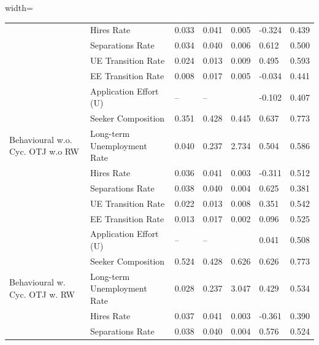 \begin{adjustbox}{width=\textwidth}
\begin{tabular}{lllllll}
\cellcolor{modelBehaviouralwCycOTJwoRW!25} & Hires Rate & 0.033 & 0.041 & 0.005 & \cellcolor{green!70!yellow!25}-0.324 & 0.439 \\
\cellcolor{modelBehaviouralwCycOTJwoRW!25} & Separations Rate & 0.034 & 0.040 & 0.006 & \cellcolor{green!70!yellow!25}0.612 & 0.500 \\
\cellcolor{modelBehaviouralwCycOTJwoRW!25} & UE Transition Rate & 0.024 & 0.013 & 0.009 & \cellcolor{green!25}0.495 & 0.593 \\
\cellcolor{modelBehaviouralwCycOTJwoRW!25} & EE Transition Rate & 0.008 & 0.017 & 0.005 & \cellcolor{orange!25}-0.034 & 0.441 \\
\cellcolor{modelBehaviouralwCycOTJwoRW!25} & Application Effort (U) & -- & -- &  & \cellcolor{yellow!25}-0.102 & 0.407 \\
\cellcolor{modelBehaviouralwCycOTJwoRW!25} & Seeker Composition & 0.351 & 0.428 & 0.445 & \cellcolor{green!40!yellow!25}0.637 & 0.773 \\
\cellcolor{modelBehaviouralwoCycOTJwoRW!25}Behavioural w.o. Cyc. OTJ w.o RW & Long-term Unemployment Rate & 0.040 & 0.237 & 2.734 & \cellcolor{green!25}0.504 & 0.586 \\
\cellcolor{modelBehaviouralwoCycOTJwoRW!25} & Hires Rate & 0.036 & 0.041 & 0.003 & \cellcolor{green!25}-0.311 & 0.512 \\
\cellcolor{modelBehaviouralwoCycOTJwoRW!25} & Separations Rate & 0.038 & 0.040 & 0.004 & \cellcolor{green!25}0.625 & 0.381 \\
\cellcolor{modelBehaviouralwoCycOTJwoRW!25} & UE Transition Rate & 0.022 & 0.013 & 0.008 & \cellcolor{yellow!25}0.351 & 0.542 \\
\cellcolor{modelBehaviouralwoCycOTJwoRW!25} & EE Transition Rate & 0.013 & 0.017 & 0.002 & \cellcolor{green!25}0.096 & 0.525 \\
\cellcolor{modelBehaviouralwoCycOTJwoRW!25} & Application Effort (U) & -- & -- &  & \cellcolor{green!70!yellow!25}0.041 & 0.508 \\
\cellcolor{modelBehaviouralwoCycOTJwoRW!25} & Seeker Composition & 0.524 & 0.428 & 0.626 & \cellcolor{orange!25}0.626 & 0.773 \\
\cellcolor{modelBehaviouralwCycOTJwRW!25}Behavioural w. Cyc. OTJ w. RW & Long-term Unemployment Rate & 0.028 & 0.237 & 3.047 & \cellcolor{yellow!25}0.429 & 0.534 \\
\cellcolor{modelBehaviouralwCycOTJwRW!25} & Hires Rate & 0.037 & 0.041 & 0.003 & \cellcolor{yellow!25}-0.361 & 0.390 \\
\cellcolor{modelBehaviouralwCycOTJwRW!25} & Separations Rate & 0.038 & 0.040 & 0.004 & \cellcolor{orange!25}0.576 & 0.524 \\

\end{tabular}
\end{adjustbox}
